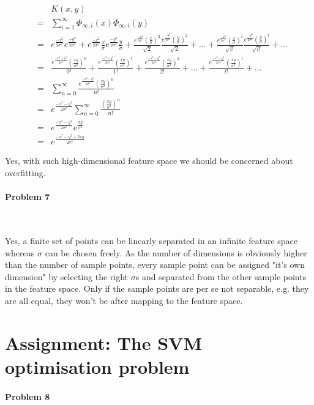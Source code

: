 \documentclass{article}
\begin{document}
\begin{eqnarray}
&&K(x,y)\\
&=& \sum_{i=1}^{\infty} \Phi_{\infty,i}(x) \Phi_{\infty,i}(y)\\
&=& e^{\frac{-x^2}{2\sigma^2}}e^{\frac{-y^2}{2\sigma^2}} + e^{\frac{-x^2}{2\sigma^2}}\frac{x}{\sigma}e^{\frac{-y^2}{2\sigma^2}}\frac{y}{\sigma} + \frac{e^{\frac{-x^2}{2\sigma^2}}\left(\frac{x}{\sigma}\right)^2}{\sqrt{2}}\frac{e^{\frac{-y^2}{2\sigma^2}}\left(\frac{y}{\sigma}\right)^2}{\sqrt{2}}+...+ \frac{e^{\frac{-x^2}{2\sigma^2}}\left(\frac{x}{\sigma}\right)^i}{\sqrt{i!}}\frac{e^{\frac{-y^2}{2\sigma^2}}\left(\frac{y}{\sigma}\right)^i}{\sqrt{i!}}+...\\
&=& \frac{e^{\frac{-x^2-y^2}{2\sigma^2}}\left( \frac{xy}{\sigma^2} \right)^0}{0!} + \frac{e^{\frac{-x^2-y^2}{2\sigma^2}}\left( \frac{xy}{\sigma^2} \right)^1}{1!} + \frac{e^{\frac{-x^2-y^2}{2\sigma^2}}\left( \frac{xy}{\sigma^2} \right)^2}{2!} + ... + \frac{e^{\frac{-x^2-y^2}{2\sigma^2}}\left( \frac{xy}{\sigma^2} \right)^i}{i!} + ...\\
&=& \sum_{n = 0}^{\infty} \frac{e^{\frac{-x^2-y^2}{2\sigma^2}}\left( \frac{xy}{\sigma^2} \right)^n}{n!}\\
&=& e^{\frac{-x^2-y^2}{2\sigma^2}} \sum_{n = 0}^{\infty} \frac{\left( \frac{xy}{\sigma^2} \right)^n}{n!}\\ 
&=& e^{\frac{-x^2-y^2}{2\sigma^2}} e^{\frac{xy}{\sigma^2}}\\
&=& e^{\frac{-x^2-y^2+2xy}{2\sigma^2}}
\end{eqnarray}

Yes, with such high-dimensional feature space we should be concerned about overfitting.

\paragraph*{Problem 7}
$\;$ 

Yes, a finite set of points can be linearly separated in an infinite feature space whereas $\sigma$ can be chosen freely. As the number of dimensions is obviously higher than the number of sample points, every sample point can be assigned "it's own dimension" by selecting the right $\sigma$s and separated from the other sample points in the feature space. Only if the sample points are per se not separable, e.g. they are all equal, they won't be after mapping to the feature space.

\section{Assignment: The SVM optimisation problem}
\paragraph*{Problem 8}
$\;$ 
\end{document}

